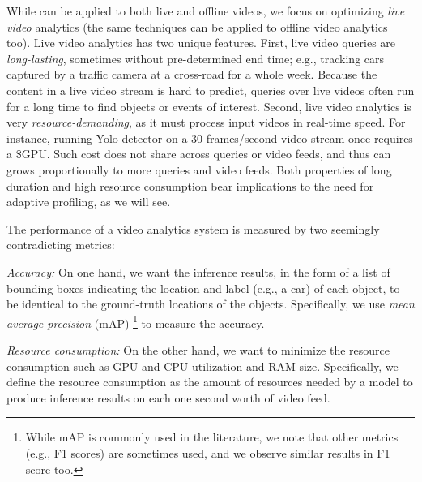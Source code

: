 While \nn can be applied to both live and offline videos, we focus on
optimizing {\em live video} analytics (the same techniques can be 
applied to offline video analytics too).
Live video analytics has two unique features.
First, live video queries are {\em long-lasting}, sometimes without 
pre-determined end time; e.g., tracking cars captured by a traffic 
camera at a cross-road for a whole week.
Because the content in a live video stream is hard to predict, queries
over live videos often run for a long time to find objects 
or events of interest. %
Second, live video analytics is very {\em resource-demanding},
as it must process input videos in real-time speed.
For instance, running Yolo detector on a 30 frames/second video stream
once requires a \$\fillme GPU. 
Such cost does not share across queries or video feeds, and thus can 
grows proportionally to more queries and video feeds.
Both properties of long duration and high resource consumption bear
implications to the need for adaptive profiling, as we will see.

The performance of a video analytics system is measured by two 
seemingly contradicting metrics:
\begin{packeditemize}
\item {\em Accuracy:} 
On one hand, we want the \nn inference results, in the form of a list
of bounding boxes indicating the location and label (e.g., a car) of 
each object, to be identical to the ground-truth locations of the 
objects.
Specifically, we use {\em mean average precision} (mAP)
\cite{http://homepages.inf.ed.ac.uk/ckiw/postscript/ijcv_voc09.pdf}
\footnote{While mAP is commonly used in the literature, we note that 
other metrics (e.g., F1 scores) are sometimes used, and we observe
similar results in F1 score too.}
to measure the accuracy.
\item {\em Resource consumption:}
On the other hand, we want to minimize the resource consumption such 
as GPU and CPU utilization and RAM size. 
Specifically, we define the resource consumption as the amount of 
resources needed by a \nn model to produce inference results on each 
one second worth of video feed.
\end{packeditemize}

